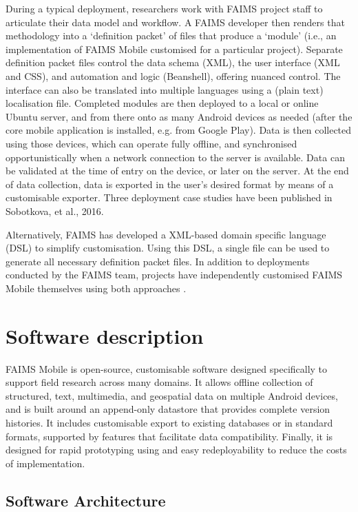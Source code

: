 \documentclass[preprint,12pt, a4paper]{elsarticle}
\begin{document}
During a typical deployment, researchers work with FAIMS project staff to articulate their data model and workflow. A FAIMS developer then renders that methodology into a `definition packet' of files that produce a `module' (i.e., an implementation of FAIMS Mobile customised for a particular project). Separate definition packet files control the data schema (XML), the user interface (XML and CSS), and automation and logic (Beanshell), offering nuanced control. The interface can also be translated into multiple languages using a (plain text) localisation file. Completed modules are then deployed to a local or online Ubuntu server, and from there onto as many Android devices as needed (after the core mobile application is installed, e.g. from Google Play). Data is then collected using those devices, which can operate fully offline, and synchronised opportunistically when a network connection to the server is available. Data can be validated at the time of entry on the device, or later on the server. At the end of data collection, data is exported in the user's desired format by means of a customisable exporter. Three deployment case studies have been published in Sobotkova, et al., 2016\cite{Sobotkova2016-mx}.

Alternatively, FAIMS has developed a XML-based domain specific language (DSL) to simplify customisation. Using this DSL, a single file can be used to generate all necessary definition packet files. In addition to deployments conducted by the FAIMS team, projects have independently customised FAIMS Mobile themselves using both approaches \cite{Good2016-gf, Kiley2016-sf}.


\section{Software description}
\label{}


FAIMS Mobile is open-source, customisable software designed specifically to support field research across many domains. It allows offline collection of structured, text, multimedia, and geospatial data on multiple Android devices, and is built around an append-only datastore that provides complete version histories. It includes customisable export to existing databases or in standard formats, supported by features that facilitate data compatibility. Finally, it is designed for rapid prototyping using and easy redeployability to reduce the costs of implementation. 


\subsection{Software Architecture}
\label{}
\end{document}
